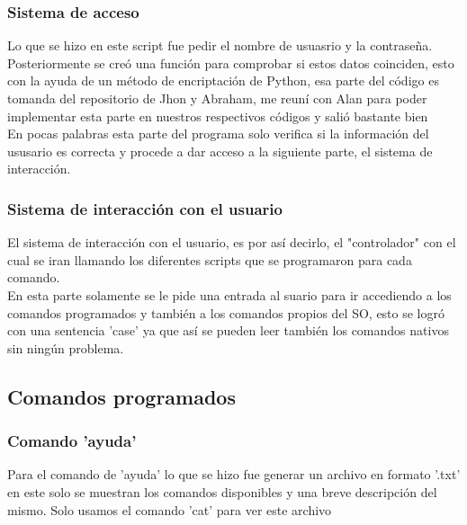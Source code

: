 \documentclass[titlepage]{article}
\begin{document}
\subsubsection{Sistema de acceso}
Lo que se hizo en este script fue pedir el nombre de usuasrio y la contraseña. Posteriormente se creó una función para comprobar si estos datos coinciden, esto con la ayuda de un método de encriptación de Python, esa parte del código es tomanda del repositorio de Jhon y Abraham, me reuní con Alan para poder implementar esta parte en nuestros respectivos códigos y salió bastante bien\\
En pocas palabras esta parte del programa solo verifica si la información del ususario es correcta y procede a dar acceso a la siguiente parte, el sistema de interacción.

\subsubsection{Sistema de interacción con el usuario}
El sistema de interacción con el usuario, es por así decirlo, el "controlador" con el cual se iran llamando los diferentes scripts que se programaron para cada comando.\\
En esta parte solamente se le pide una entrada al suario para ir accediendo a los comandos programados y también a los comandos propios del SO, esto se logró con una sentencia 'case' ya que así se pueden leer también los comandos nativos sin ningún problema.

\subsection{Comandos programados}
\subsubsection{Comando 'ayuda'}
Para el comando de 'ayuda' lo que se hizo fue generar un archivo en formato '.txt' en este solo se muestran los comandos disponibles y una breve descripción del mismo. Solo usamos el comando 'cat' para ver este archivo
\end{document}
